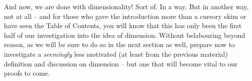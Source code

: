 And now, we are done with dimensionality! Sort of. In a way. But in another way, not at all -- and for those who gave the introduction more than a cursory skim or have seen the Table of Contents, you will know that this has only been the first half of our investigation into the idea of dimension. Without belabouring beyond reason, as we will be sure to do so in the next section as well, prepare now to investigate a \emph{seemingly} less motivated (at least from the previous material) definition and discussion on dimension -- but one that will become vital to our proofs to come.
